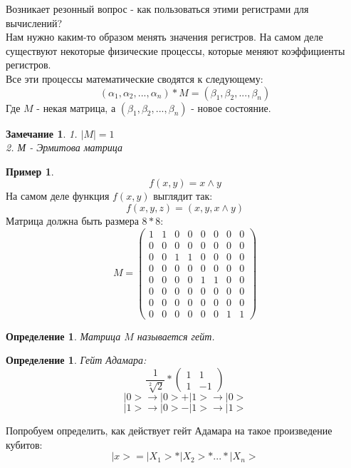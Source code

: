 \documentclass{beamer}
\theoremstyle{plain}
\newtheorem{rmk}[thm]{Замечание}
\newtheorem{dfn}[thm]{Определение}
\theoremstyle{definition}
\newtheorem{ex}[thm]{Пример}
\begin{document}
\begin{frame}
    Возникает резонный вопрос - как пользоваться этими регистрами для вычислений? \\
    Нам нужно каким-то образом менять значения регистров. На самом деле существуют некоторые физические процессы, которые меняют коэффициенты регистров. \\
    Все эти процессы математические сводятся к следующему:
    $$ (\alpha_1, \alpha_2, ... , \alpha_n) * M = (\beta_1, \beta_2, ... , \beta_n) $$
    Где $M$ - некая матрица, а $ (\beta_1, \beta_2, ... , \beta_n) $ - новое состояние.
    \begin{rmk}
        1. $|M| = 1$ \\
        2. М - Эрмитова матрица
    \end{rmk}
\end{frame}

\begin{frame}
    \begin{ex}
        $$ f(x, y) = x \wedge y $$
        На самом деле функция $f(x, y)$ выглядит так: $$ f(x, y, z) = (x, y, x \wedge y ) $$
        Матрица должна быть размера $ 8*8 $: \\
        $$ M = 
             \begin{pmatrix}
              1 & 1 & 0 & 0 & 0 & 0 & 0 & 0 \\
              0 & 0 & 0 & 0 & 0 & 0 & 0 & 0 \\
              0 & 0 & 1 & 1 & 0 & 0 & 0 & 0 \\
              0 & 0 & 0 & 0 & 0 & 0 & 0 & 0 \\
              0 & 0 & 0 & 0 & 1 & 1 & 0 & 0 \\
              0 & 0 & 0 & 0 & 0 & 0 & 0 & 0 \\
              0 & 0 & 0 & 0 & 0 & 0 & 0 & 0 \\
              0 & 0 & 0 & 0 & 0 & 0 & 1 & 1
             \end{pmatrix}  $$
    \end{ex}
\end{frame}

\begin{frame}
    \begin{dfn}
        Матрица $M$ называется гейт.
    \end{dfn}
    \begin{dfn}
        Гейт Адамара:
         $$ \frac{1}{\sqrt[2]{2}} * 
             \begin{pmatrix}
              1 & 1 \\
              1 & -1
             \end{pmatrix}  $$
        $$ |0> \rightarrow |0> + |1> \rightarrow |0>$$
        $$ |1> \rightarrow |0> - |1> \rightarrow |1>$$
    \end{dfn}
    Попробуем определить, как действует гейт Адамара на такое произведение кубитов: $$ |x> = |X_1> * |X_2> * ... * |X_n>$$
\end{frame}
\end{document}
